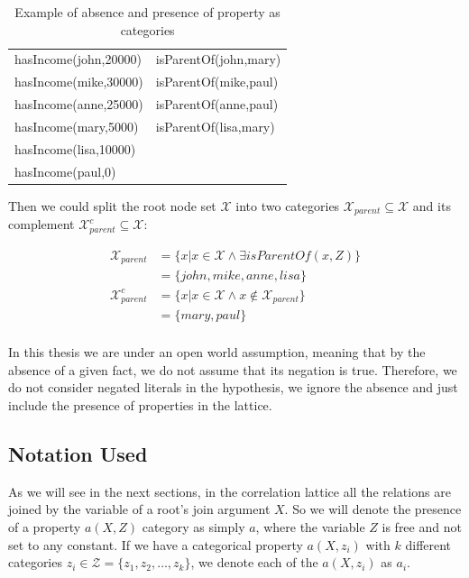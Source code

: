 \begin{table}[h!]
 \begin{center}
 \caption{Example of absence and presence of property as categories}
  \begin{tabular}{l l}
    \toprule
    hasIncome(john,20000) & isParentOf(john,mary) \\
    hasIncome(mike,30000) & isParentOf(mike,paul) \\
    hasIncome(anne,25000) & isParentOf(anne,paul) \\
    hasIncome(mary,5000)  & isParentOf(lisa,mary) \\
    hasIncome(lisa,10000) & 			\\
    hasIncome(paul,0)	  & 			\\
    \bottomrule
  \end{tabular}
 \label{tab:cat3}
 \end{center}
\end{table}

Then we could split the root node set $\mathcal{X}$ into two categories $\mathcal{X}_{parent} \subseteq \mathcal{X}$
and its complement $\mathcal{X}_{parent}^{c} \subseteq \mathcal{X}$:

\begin{align*}
 \mathcal{X}_{parent}&=\{x| x \in \mathcal{X} \land \exists isParentOf(x,Z)\} \\
  &=\{john,mike,anne,lisa\} \\
 \mathcal{X}_{parent}^{c}&=\{x| x \in \mathcal{X} \land x \not \in \mathcal{X}_{parent} \} \\
  &=\{mary,paul\} \\
\end{align*}

In this thesis we are under an open world assumption, meaning that by the absence of a given fact, we do
not assume that its negation is true. Therefore, we do not consider negated literals in the hypothesis, we
ignore the absence and just include the presence of properties in the lattice.

\subsection{Notation Used}
\label{sec:notation}

As we will see in the next sections, in the correlation lattice all the relations are joined by the variable of
a root's join argument $X$. So we will denote the presence of a property $a(X,Z)$ category as simply $a$, where the
variable $Z$ is free and not set to any constant. If we have a categorical property $a(X,z_i)$ with $k$ different
categories $z_i \in \mathcal{Z}=\{ z_1,z_2,\ldots,z_k\}$, we denote each of the $a(X,z_i)$ as $a_i$.

